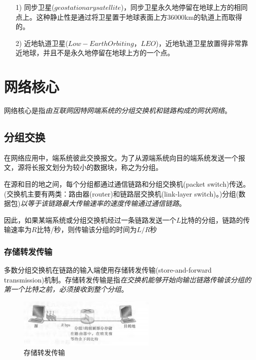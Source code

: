 \begin{itemize}
    \item [1)] 同步卫星($geostationary satellite$)，同步卫星永久地停留在地球上方的相同点上。这种静止性是通过将卫星置于地球表面上方36000km的轨道上而取得的。
    \item [2)] 近地轨道卫星($Low-Earth Orbiting， LEO$)，近地轨道卫星放置得非常靠近地球，并且不是永久地停留在地球上方的一个点。
\end{itemize}

\section{网络核心}

    网络核心是指\emph{由互联网因特网端系统的分组交换机和链路构成的网状网络}。

\subsection{分组交换}

    在网络应用中，端系统彼此交换报文。为了从源端系统向目的端系统发送一个报文，源将长报文划分为较小的数据块，称之为分组。

    在源和目的地之间，每个分组都通过通信链路和分组交换机(packet switch)传送。(交换机主要有两类：路由器(router)和链路层交换机(link-layer switch)。)分组(数据包)\emph{以等于该链路最大传输速率的速度传输通过通信链路}。

    因此，如果某端系统或分组交换机经过一条链路发送一个$L$比特的分组，链路的传输速率为$R$比特/秒，则传输该分组的时间为$L/R$秒

\subsubsection{存储转发传输}

    多数分组交换机在链路的输入端使用存储转发传输(store-and-forward transmission)机制。存储转发传输是指\emph{在交换机能够开始向输岀链路传输该分组的第一个比特之前，必须接收到整个分组}。

\begin{figure}[!htbp]
    \centering
    \includegraphics[width=0.6\textwidth]{image/chapter01/存储转发.png}
    \caption{存储转发传输}
\end{figure}

